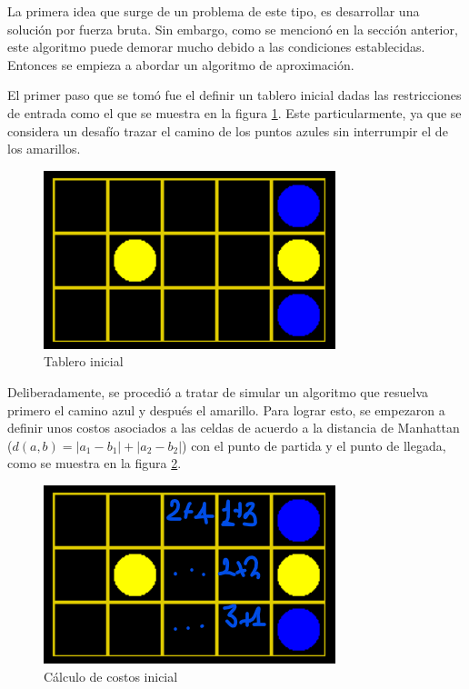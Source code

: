 \documentclass[letter,12pt]{article}
\begin{document}
La primera idea que surge de un problema de este tipo, es desarrollar una solución por fuerza bruta. Sin embargo, como se mencionó en la sección anterior, este algoritmo puede demorar mucho debido a las condiciones establecidas. Entonces se empieza a abordar un algoritmo de aproximación. \par

El primer paso que se tomó fue el definir un tablero inicial dadas las restricciones de entrada como el que se muestra en la figura \ref{fig:grid_algo1}. Este particularmente, ya que se considera un desafío trazar el camino de los puntos azules sin interrumpir el de los amarillos. \par

\begin{figure}[ht!]
    \centering
    \includegraphics[scale=0.7]{img/grid_algo1.png}
    \vspace{-0.5em}
    \caption{Tablero inicial}
    \label{fig:grid_algo1}
\end{figure}

Deliberadamente, se procedió a tratar de simular un algoritmo que resuelva primero el camino azul y después el amarillo. Para lograr esto, se empezaron a definir unos costos asociados a las celdas de acuerdo a la distancia de Manhattan ($d(a,b) = |a_1 - b_1| + |a_2 - b_2|$) con el punto de partida y el punto de llegada, como se muestra en la figura \ref{fig:grid_algo2}. \par

\begin{figure}[ht!]
    \centering
    \includegraphics[scale=0.7]{img/grid_algo2.png}
    \vspace{-0.5em}
    \caption{Cálculo de costos inicial}
    \label{fig:grid_algo2}
\end{figure}
\end{document}
